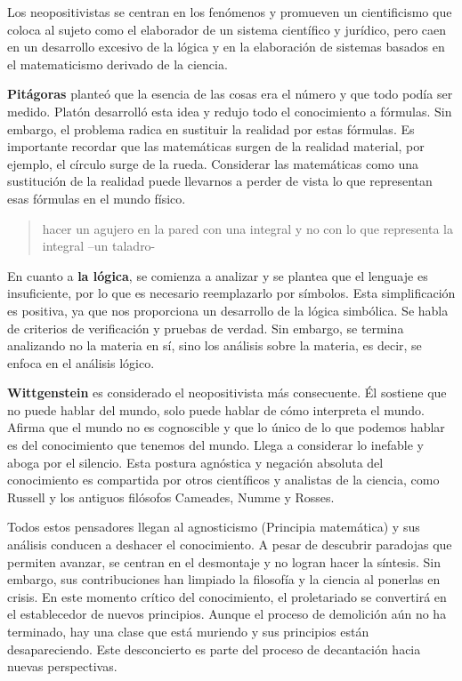 \documentclass[
  a4paper,
]{article}
\begin{document}
Los neopositivistas se centran en los fenómenos y promueven un
cientificismo que coloca al sujeto como el elaborador de un sistema
científico y jurídico, pero caen en un desarrollo excesivo de la lógica
y en la elaboración de sistemas basados en el matematicismo derivado de
la ciencia.

\textbf{Pitágoras} planteó que la esencia de las cosas era el número y
que todo podía ser medido. Platón desarrolló esta idea y redujo todo el
conocimiento a fórmulas. Sin embargo, el problema radica en sustituir la
realidad por estas fórmulas. Es importante recordar que las matemáticas
surgen de la realidad material, por ejemplo, el círculo surge de la
rueda. Considerar las matemáticas como una sustitución de la realidad
puede llevarnos a perder de vista lo que representan esas fórmulas en el
mundo físico.

\begin{quote}
hacer un agujero en la pared con una integral y no con lo que representa
la integral --un taladro-
\end{quote}

En cuanto a \textbf{la lógica}, se comienza a analizar y se plantea que
el lenguaje es insuficiente, por lo que es necesario reemplazarlo por
símbolos. Esta simplificación es positiva, ya que nos proporciona un
desarrollo de la lógica simbólica. Se habla de criterios de verificación
y pruebas de verdad. Sin embargo, se termina analizando no la materia en
sí, sino los análisis sobre la materia, es decir, se enfoca en el
análisis lógico.

\textbf{Wittgenstein} es considerado el neopositivista más consecuente.
Él sostiene que no puede hablar del mundo, solo puede hablar de cómo
interpreta el mundo. Afirma que el mundo no es cognoscible y que lo
único de lo que podemos hablar es del conocimiento que tenemos del
mundo. Llega a considerar lo inefable y aboga por el silencio. Esta
postura agnóstica y negación absoluta del conocimiento es compartida por
otros científicos y analistas de la ciencia, como Russell y los antiguos
filósofos Cameades, Numme y Rosses.

Todos estos pensadores llegan al agnosticismo (Principia matemática) y
sus análisis conducen a deshacer el conocimiento. A pesar de descubrir
paradojas que permiten avanzar, se centran en el desmontaje y no logran
hacer la síntesis. Sin embargo, sus contribuciones han limpiado la
filosofía y la ciencia al ponerlas en crisis. En este momento crítico
del conocimiento, el proletariado se convertirá en el establecedor de
nuevos principios. Aunque el proceso de demolición aún no ha terminado,
hay una clase que está muriendo y sus principios están desapareciendo.
Este desconcierto es parte del proceso de decantación hacia nuevas
perspectivas.
\end{document}

